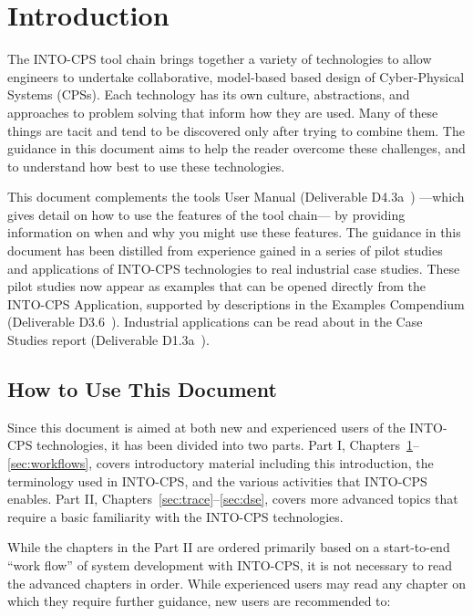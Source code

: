\chapter{Introduction}
\label{sec:intro}

The INTO-CPS tool chain brings together a variety of technologies to allow engineers to undertake collaborative, model-based based design of Cyber-Physical Systems (CPSs). Each technology has its own culture, abstractions, and approaches to problem solving that inform how they are used. Many of these things are tacit and tend to be discovered only after trying to combine them. The guidance in this document aims to help the reader overcome these challenges, and to understand how best to use these technologies.

This document complements the tools User Manual (Deliverable D4.3a~\cite{INTOCPSD4.3a}) ---which gives detail on how to use the features of the tool chain--- by providing information on when and why you might use these features. The guidance in this document has been distilled from experience gained in a series of pilot studies and applications of INTO-CPS technologies to real industrial case studies. These pilot studies now appear as examples that can be opened directly from the INTO-CPS Application, supported by descriptions in the Examples Compendium (Deliverable D3.6~\cite{INTOCPSD3.6}). Industrial applications can be read about in the Case Studies report (Deliverable D1.3a~\cite{INTOCPSD1.3a}).


\section{How to Use This Document}
\label{sec:intro:howto}

Since this document is aimed at both new and experienced users of the INTO-CPS technologies, it has been divided into two parts. Part I, Chapters~\ref{sec:intro}--\ref{sec:workflows}, covers introductory material including this introduction, the terminology used in INTO-CPS, and the various activities that INTO-CPS enables. Part II, Chapters~\ref{sec:trace}--\ref{sec:dse}, covers more advanced topics that require a basic familiarity with the INTO-CPS technologies.

While the chapters in the Part II are ordered primarily based on a start-to-end ``work flow'' of system development with INTO-CPS, it is not necessary to read the advanced chapters in order. While experienced users may read any chapter on which they require further guidance, new users are recommended to:

